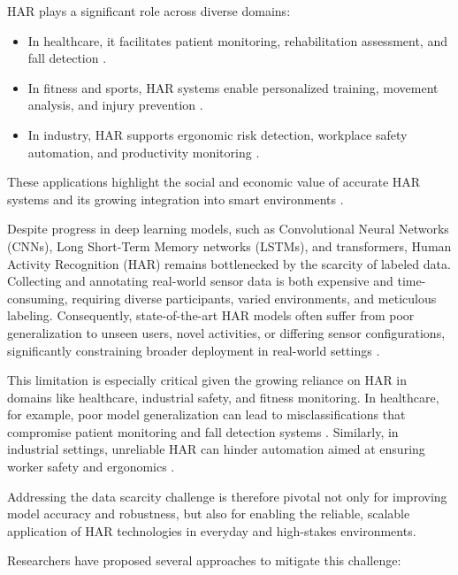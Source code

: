 HAR plays a significant role across diverse domains:
\begin{itemize}
    \item In healthcare, it facilitates patient monitoring, rehabilitation assessment, and fall detection \cite{yoshida2022data, sangeethalakshmi2023patient}.
    \item In fitness and sports, HAR systems enable personalized training, movement analysis, and injury prevention \cite{stromback2020mm}.
    \item In industry, HAR supports ergonomic risk detection, workplace safety automation, and productivity monitoring \cite{suh2023worker}.
\end{itemize}
These applications highlight the social and economic value of accurate HAR systems and its growing integration into smart environments \cite{hammerla2016deep, wang2019deep}.


Despite progress in deep learning models, such as Convolutional Neural Networks (CNNs), Long Short-Term Memory networks (LSTMs), and transformers, Human Activity Recognition (HAR) remains bottlenecked by the scarcity of labeled data. Collecting and annotating real-world sensor data is both expensive and time-consuming, requiring diverse participants, varied environments, and meticulous labeling. Consequently, state-of-the-art HAR models often suffer from poor generalization to unseen users, novel activities, or differing sensor configurations, significantly constraining broader deployment in real-world settings \cite{lara2012survey, hammerla2016deep}.

This limitation is especially critical given the growing reliance on HAR in domains like healthcare, industrial safety, and fitness monitoring. In healthcare, for example, poor model generalization can lead to misclassifications that compromise patient monitoring and fall detection systems \cite{yoshida2022data}. Similarly, in industrial settings, unreliable HAR can hinder automation aimed at ensuring worker safety and ergonomics \cite{suh2023worker}.

Addressing the data scarcity challenge is therefore pivotal not only for improving model accuracy and robustness, but also for enabling the reliable, scalable application of HAR technologies in everyday and high-stakes environments.

Researchers have proposed several approaches to mitigate this challenge:

